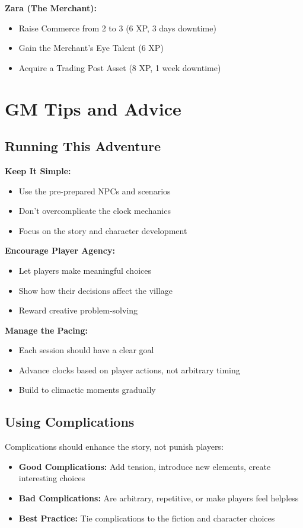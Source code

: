 \documentclass[11pt]{article}
\begin{document}
\textbf{Zara (The Merchant):}
\begin{itemize}
\item Raise Commerce from 2 to 3 (6 XP, 3 days downtime)
\item Gain the Merchant's Eye Talent (6 XP)
\item Acquire a Trading Post Asset (8 XP, 1 week downtime)
\end{itemize}

\section{GM Tips and Advice}

\subsection{Running This Adventure}

\textbf{Keep It Simple:}
\begin{itemize}
\item Use the pre-prepared NPCs and scenarios
\item Don't overcomplicate the clock mechanics
\item Focus on the story and character development
\end{itemize}

\textbf{Encourage Player Agency:}
\begin{itemize}
\item Let players make meaningful choices
\item Show how their decisions affect the village
\item Reward creative problem-solving
\end{itemize}

\textbf{Manage the Pacing:}
\begin{itemize}
\item Each session should have a clear goal
\item Advance clocks based on player actions, not arbitrary timing
\item Build to climactic moments gradually
\end{itemize}

\subsection{Using Complications}

Complications should enhance the story, not punish players:
\begin{itemize}
\item \textbf{Good Complications:} Add tension, introduce new elements, create interesting choices
\item \textbf{Bad Complications:} Are arbitrary, repetitive, or make players feel helpless
\item \textbf{Best Practice:} Tie complications to the fiction and character choices
\end{itemize}
\end{document}
